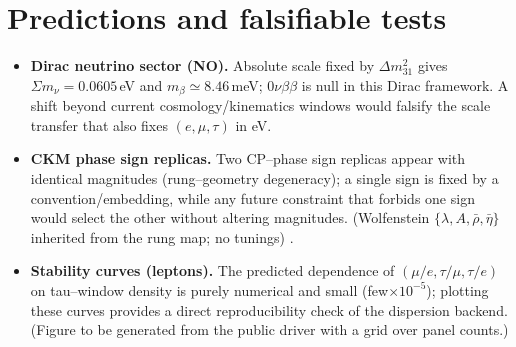 \documentclass[11pt]{article}
\begin{document}
\section{Predictions and falsifiable tests}
\begin{itemize}
  \item \textbf{Dirac neutrino sector (NO).} Absolute scale fixed by $\Delta m^2_{31}$ gives $\Sigma m_\nu=0.0605$\,eV and $m_\beta\simeq 8.46$\,meV; $0\nu\beta\beta$ is null in this Dirac framework. A shift beyond current cosmology/kinematics windows would falsify the scale transfer that also fixes $(e,\mu,\tau)$ in eV.
  \item \textbf{CKM phase sign replicas.} Two CP–phase sign replicas appear with identical magnitudes (rung–geometry degeneracy); a single sign is fixed by a convention/embedding, while any future constraint that forbids one sign would select the other without altering magnitudes. (Wolfenstein $\{\lambda,A,\bar\rho,\bar\eta\}$ inherited from the rung map; no tunings) \cite{Wolfenstein1983,PDG2024}.
  \item \textbf{Stability curves (leptons).} The predicted dependence of $(\mu/e,\tau/\mu,\tau/e)$ on tau--window density is purely numerical and small (few$\times10^{-5}$); plotting these curves provides a direct reproducibility check of the dispersion backend. (Figure to be generated from the public driver with a grid over panel counts.)
\end{itemize}
\end{document}
